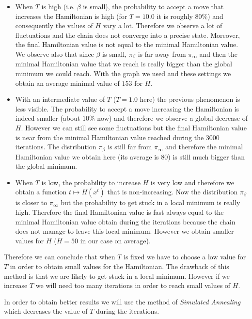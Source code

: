 \documentclass[a4paper]{article}
\begin{document}
\begin{itemize}
\item When $T$ is high (i.e. $\beta$ is small), the probability to accept a move that increases the Hamiltonian is high (for $T=10.0$ it is roughly $80\%$) and consequently the values of $H$ vary a lot. Therefore we observe a lot of fluctuations and the chain does not converge into a precise state. Moreover, the final Hamiltonian value is not equal to the minimal Hamiltonian value. We observe also that since $\beta$ is small, $\pi_{\beta}$ is far away from $\pi_{\infty}$ and then the minimal Hamiltonian value that we reach is really bigger than the global minimum we could reach. With the graph we used and these settings we obtain an average minimal value of $153$ for $H$.
\item With an intermediate value of $T$ ($T=1.0$ here) the previous phenomenon is less visible. The probability to accept a move increasing the Hamiltonian is indeed smaller (about $10\%$ now) and therefore we observe a global decrease of $H$. However we can still see some fluctuations but the final Hamiltonian value is near from the minimal Hamiltonian value reached during the $3000$ iterations. The distribution $\pi_{\beta}$ is still far from $\pi_{\infty}$ and therefore the minimal Hamiltonian value we obtain here (its average is $80$) is still much bigger than the global minimum.
\item When $T$ is low, the probability to increase $H$ is very low and therefore we obtain a function $t \mapsto H(x^t)$ that is non-increasing. Now the distribution $\pi_{\beta}$ is closer to $\pi_{\infty}$ but the probability to get stuck in a local minimum is really high. Therefore the final Hamiltonian value is fast always equal to the minimal Hamiltonian value obtain during the iterations because the chain does not manage to leave this local minimum. However we obtain smaller values for $H$ ($H=50$ in our case on average).
\end{itemize}

Therefore we can conclude that when $T$ is fixed we have to choose a low value for $T$ in order to obtain small values for the Hamiltonian. The drawback of this method is that we are likely to get stuck in a local minimum. However if we increase $T$ we will need too many iterations in order to reach small values of $H$.

In order to obtain better results we will use the method of \textit{Simulated Annealing} which decreases the value of $T$ during the iterations.
\end{document}
